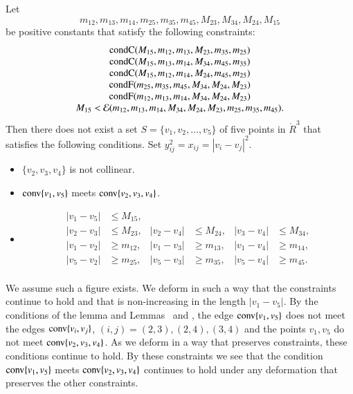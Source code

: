 \begin{tarskidata}
\begin{tarski}
\begin{lemma}
Let $$m_{12},m_{13},m_{14},m_{25},m_{35},m_{45},M_{23},M_{34},M_{24},M_{15}$$ 
be positive constants that satisfy the following constraints:
	$$
	\begin{array}{clll}
	{\operatorname{condC}}(M_{15},m_{12},m_{13},M_{23},m_{35},m_{25})\\
	{\operatorname{condC}}(M_{15},m_{13},m_{14},M_{34},m_{45},m_{35})\\
	{\operatorname{condC}}(M_{15},m_{12},m_{14},M_{24},m_{45},m_{25})\\
	{\operatorname{condF}}(m_{25},m_{35},m_{45},M_{34},M_{24},M_{23})\\
        {\operatorname{condF}}(m_{12},m_{13},m_{14},M_{34},M_{24},M_{23})\\
	M_{15} < {\mathcal E}(m_{12},m_{13},m_{14},M_{34},M_{24},M_{23},m_{25},m_{35},m_{45}).
	\end{array}
	$$
Then there does not exist a set $S=\{v_1,v_2,\ldots,v_5\}$ of five
points  in $\ring{R}^3$ that satisfies the following conditions.  
Set $y_{ij}^2 = x_{ij} = |v_i-v_j|^2$.
	\begin{itemize}
	\item $\{v_2,v_3,v_4\}$ is not collinear.
	\item ${\operatorname{conv}}\{v_1,v_5\}$ meets ${\operatorname{conv}}\{v_2,v_3,v_4\}$.
	\item 
		$$
		\begin{array}{rlrlrl}
		|v_1-v_5| &\le M_{15},\\
		|v_2-v_3| &\le M_{23}, &|v_2-v_4| &\le M_{24}, & |v_3-v_4|&\le M_{34},\\
		|v_1-v_2| &\ge m_{12},&|v_1-v_3| &\ge m_{13},& |v_1-v_4|&\ge m_{14},\\
		|v_5-v_2| &\ge m_{25},&|v_5-v_3| &\ge m_{35},& |v_5-v_4|&\ge m_{45}.\\
		\end{array}
		$$
	\end{itemize}
\end{lemma}



\begin{proved}
We assume such a figure exists.  We deform in such a way that the constraints continue
to hold and that is non-increasing in the length $|v_1-v_5|$.  By the conditions of the
lemma and Lemmas~ and , 
the edge ${\operatorname{conv}}\{v_1,v_5\}$
does not meet the
 edges ${\operatorname{conv}}\{v_i,v_j\}$, $(i,j)=(2,3),(2,4),(3,4)$ 
and the points $v_1,v_5$
do not meet ${\operatorname{conv}}\{v_2,v_3,v_4\}$.  As we deform in a way that preserves constraints,
these conditions continue to hold.  By these constraints we see that the condition
  ${\operatorname{conv}}\{v_1,v_5\}$ meets ${\operatorname{conv}}\{v_2,v_3,v_4\}$
continues to hold under any deformation that preserves the other constraints.


\end{proved}
\end{tarski}
\end{tarskidata}
